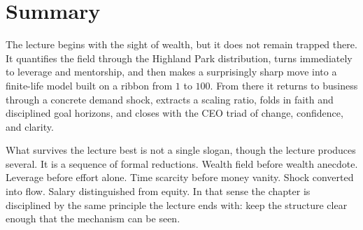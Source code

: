 \section{Summary}

The lecture begins with the sight of wealth, but it does not remain trapped there. It quantifies the field through the Highland Park distribution, turns immediately to leverage and mentorship, and then makes a surprisingly sharp move into a finite-life model built on a ribbon from \(1\) to \(100\). From there it returns to business through a concrete demand shock, extracts a scaling ratio, folds in faith and disciplined goal horizons, and closes with the CEO triad of change, confidence, and clarity.

What survives the lecture best is not a single slogan, though the lecture produces several. It is a sequence of formal reductions. Wealth field before wealth anecdote. Leverage before effort alone. Time scarcity before money vanity. Shock converted into flow. Salary distinguished from equity. In that sense the chapter is disciplined by the same principle the lecture ends with: keep the structure clear enough that the mechanism can be seen.